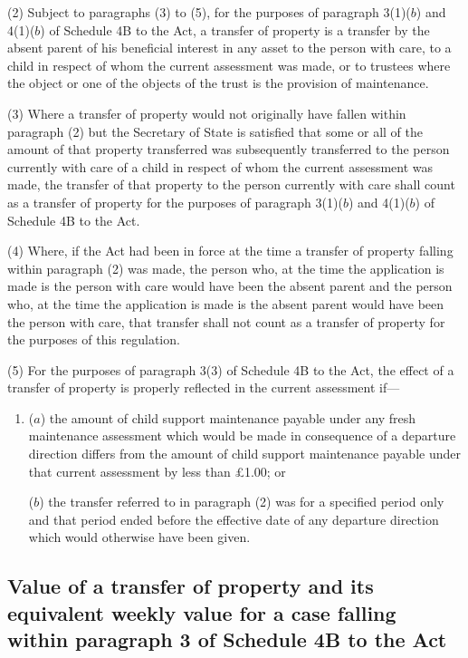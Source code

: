 \documentclass[12pt,a4paper]{article}
\begin{document}
(2) Subject to paragraphs (3) to (5), for the purposes of paragraph 3(1)($b$) and
4(1)($b$) of Schedule 4B to the Act, a transfer of property is a transfer by the
absent parent of his beneficial interest in any asset to the person with care,
to a child in respect of whom the current assessment was made, or to trustees
where the object or one of the objects of the trust is the provision of
maintenance.

(3) Where a transfer of property would not originally have fallen within
paragraph (2) but the Secretary of State is satisfied that some or all of the
amount of that property transferred was subsequently transferred to the person
currently with care of a child in respect of whom the current assessment was
made, the transfer of that property to the person currently with care shall
count as a transfer of property for the purposes of paragraph 3(1)($b$) and
4(1)($b$) of Schedule 4B to the Act.

(4) Where, if the Act had been in force at the time a transfer of property
falling within paragraph (2) was made, the person who, at the time the
application is made is the person with care would have been the absent parent
and the person who, at the time the application is made is the absent parent
would have been the person with care, that transfer shall not count as a
transfer of property for the purposes of this regulation.

(5) For the purposes of paragraph 3(3) of Schedule 4B to the Act, the effect of
a transfer of property is properly reflected in the current assessment if—
\begin{enumerate}\item[]
($a$) the amount of child support maintenance payable under any fresh maintenance
assessment which would be made in consequence of a departure direction differs
from the amount of child support maintenance payable under that current
assessment by less than £1.00; or

($b$) the transfer referred to in paragraph (2) was for a specified period only and
that period ended before the effective date of any departure direction which
would otherwise have been given.
\end{enumerate}

\subsection[22. Value of a transfer of property and its equivalent weekly value for a case
falling within paragraph 3 of Schedule 4B to the Act]{Value of a transfer of property and its equivalent weekly value for a case
falling within paragraph 3 of Schedule 4B to the Act}
\end{document}
